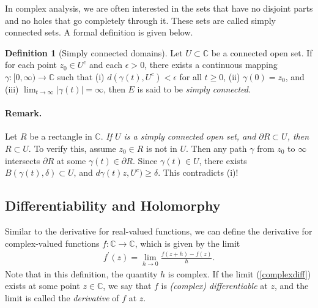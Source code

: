 \documentclass{article}
\numberwithin{equation}{section}
\newcommand{\bbC}{\mathbb{C}}
\theoremstyle{plain}
\theoremstyle{definition}
\newtheorem{definition}[theorem]{Definition}
\begin{document}
In complex analysis, we are often interested in the sets that have no disjoint parts and no holes that go completely through it. These sets are called simply connected sets. A formal definition is given below.
\begin{definition}[Simply connected domains]
Let $U\subset\bbC$ be a connected open set. If for each point $z_0\in U^c$ and each $\epsilon>0$, there exists a continuous mapping $\gamma:[0,\infty)\to\bbC$ such that (i) $d(\gamma(t),U^c)<\epsilon$ for all $t\geq 0$, (ii) $\gamma(0)=z_0$, and (iii) $\lim_{t\to\infty}\vert\gamma(t)\vert=\infty$, then $E$ is said to be \textit{simply connected}.
\end{definition}
\paragraph{Remark.} Let $R$ be a rectangle in $\bbC$. \textit{If $U$ is a simply connected open set, and $\partial R\subset U$, then $R\subset U$}. To verify this, assume $z_0\in R$ is not in $U$. Then any path $\gamma$ from $z_0$ to $\infty$ intersects $\partial R$ at some $\gamma(t)\in\partial R$. Since $\gamma(t)\in U$, there exists $B(\gamma(t),\delta)\subset U$, and $d\gamma(t)z,U^c)\geq\delta$. This contradicts (i)!

\newpage
\subsection{Differentiability and Holomorphy}
Similar to the derivative for real-valued functions, we can define the derivative for complex-valued functions $f:\bbC\to\bbC$, which is given by the limit
\begin{align}
	f^\prime(z)=\lim_{h\to 0}\frac{f(z+h)-f(z)}{h}.\label{complexdiff}
\end{align}
Note that in this definition, the quantity $h$ is complex. If the limit (\ref{complexdiff}) exists at some point $z\in\bbC$, we say that $f$ is \textit{(complex) differentiable} at $z$, and the limit is called the \textit{derivative} of $f$ at $z$.
\end{document}
